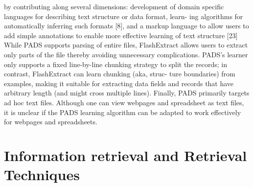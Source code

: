 \documentclass[\myrootdir/main.tex]{subfiles}
\begin{document}
{by contributing along several dimensions: development of domain specific languages for describing text structure or data format, learn- ing algorithms for automatically inferring such formats [8], and a markup language to allow users to add simple annotations to enable more effective learning of text structure [23] While PADS supports parsing of entire files, FlashExtract allows users to extract only parts of the file thereby avoiding unnecessary complications. PADS’s learner only supports a fixed line-by-line chunking strategy to split the records; in contrast, FlashExtract can learn chunking (aka, struc- ture boundaries) from examples, making it suitable for extracting data fields and records that have arbitrary length (and might cross multiple lines). Finally, PADS primarily targets ad hoc text files. Although one can view webpages and spreadsheet as text files, it is unclear if the PADS learning algorithm can be adapted to work effectively for webpages and spreadsheets.
}


\section{Information retrieval and Retrieval Techniques}



\end{document}
